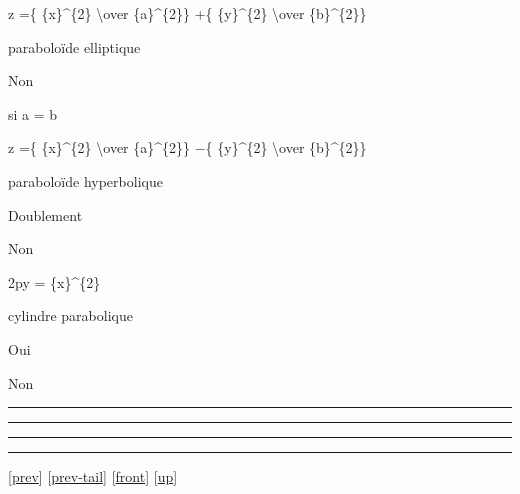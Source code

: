 \documentclass[]{article}
\begin{document}
z =\{ \{x\}\^{}\{2\} \textbackslash{}over \{a\}\^{}\{2\}\} +\{
\{y\}\^{}\{2\} \textbackslash{}over \{b\}\^{}\{2\}\}

paraboloïde elliptique

Non

si a = b

z =\{ \{x\}\^{}\{2\} \textbackslash{}over \{a\}\^{}\{2\}\} −\{
\{y\}\^{}\{2\} \textbackslash{}over \{b\}\^{}\{2\}\}

paraboloïde hyperbolique

Doublement

Non

2py = \{x\}\^{}\{2\}

cylindre parabolique

Oui

Non

\begin{center}\rule{3in}{0.4pt}\end{center}

\begin{center}\rule{3in}{0.4pt}\end{center}

\begin{center}\rule{3in}{0.4pt}\end{center}

\begin{center}\rule{3in}{0.4pt}\end{center}

{[}\href{coursse102.html}{prev}{]}
{[}\href{coursse102.html\#tailcoursse102.html}{prev-tail}{]}
{[}\href{coursse103.html}{front}{]}
{[}\href{coursch20.html\#coursse103.html}{up}{]}
\end{document}

